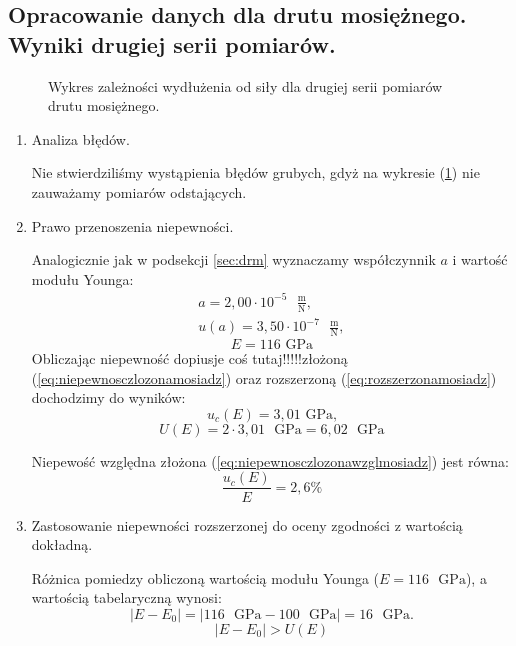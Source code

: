 \documentclass [a4paper,11pt]{article}
\begin{document}
	\subsection{Opracowanie danych dla drutu mosiężnego. Wyniki drugiej serii pomiarów.}
	
	\begin{figure}[!h]
		\centering

		\caption{Wykres zależności wydłużenia od siły dla drugiej serii pomiarów drutu mosiężnego.}
		\label{fig:wykmosiadz2}
	\end{figure}
	
	\begin{enumerate}[label=\alph*)]
		\item Analiza błędów.
		
		Nie stwierdziliśmy wystąpienia błędów grubych, gdyż na wykresie (\ref{fig:wykmosiadz2}) nie zauważamy pomiarów odstających.
		
		\item Prawo przenoszenia niepewności.
		
		Analogicznie jak w podsekcji \ref{sec:drm} wyznaczamy współczynnik $a$ i wartość modułu Younga:
		\begin{align}
		a = 2,00 \cdot 10^{-5} \text{ }\mathrm{\frac{m}{N}},\label{a} \\
		u(a) = 3,50 \cdot 10^{-7} \text{ }\mathrm{\frac{m}{N}},
		\end{align}
		$$ E = 116 \text{ GPa} $$
		Obliczając niepewność dopiusje coś tutaj!!!!!złożoną (\ref{eq:niepewnosczlozonamosiadz}) oraz rozszerzoną (\ref{eq:rozszerzonamosiadz}) dochodzimy do wyników: 
		$$ u_c(E) = 3,01 \text{ GPa,} $$
		$$ U(E) = 2 \cdot 3,01 \text{ }\mathrm{GPa} = 6,02 \text{ }\mathrm{GPa} $$
		
		Niepewość względna złożona (\ref{eq:niepewnosczlozonawzglmosiadz}) jest równa:
		$$ \frac{u_c(E)}{E} = 2,6\% $$
		
		\item Zastosowanie niepewności rozszerzonej do oceny zgodności z wartością dokładną.
		
		Różnica pomiedzy obliczoną wartością modułu Younga ($E=116  \text{ }\mathrm{GPa}$), a wartością tabelaryczną wynosi:
		\begin{equation}
		\label{eq:roznicamosiadz2}
		|E - E_0| = \left|116 \text{ }\mathrm{GPa} - 100 \text{ }\mathrm{GPa}\right| = 16 \text{ }\mathrm{GPa}.
		\end{equation}
		$$
		|E - E_0| > U(E)
		$$
		
		
	\end{enumerate}
\end{document}

